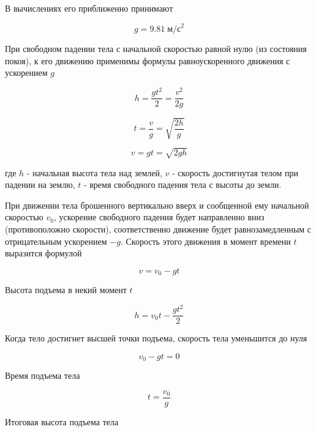 \documentclass[a4paper,12pt]{article}
\begin{document}
		В вычислениях его приближенно принимают

		\begin{equation*}
			g = 9.81 \; \text{м/с}^2
		\end{equation*}
		
		При свободном падении тела с начальной скоростью равной нулю 
		(из состояния покоя), к его движению применимы формулы
		равноускоренного движения с ускорением $g$

		\begin{equation}
			h = \frac{gt^2}{2} = \frac{v^2}{2g}
		\end{equation}

		\begin{equation}
			t = \frac{v}{g} = \sqrt{\frac{2h}{g}}
		\end{equation}

		\begin{equation}
			v = gt = \sqrt{2gh}
		\end{equation}

		где $h$ - начальная высота тела над землей, 
		$v$ - скорость достигнутая телом при падении на землю,
		$t$ - время свободного падения тела с высоты до земли.

		При движении тела брошенного вертикально вверх и сообщенной ему начальной 
		скоростью $v_0$, ускорение свободного падения будет направленно вниз 
		(противоположно скорости), соответственно движение будет равнозамедленным 
		с отрицательным ускорением $-g$. Скорость этого движения в момент времени $t$
		выразится формулой

		\begin{equation}
			v = v_0 - gt
		\end{equation}

		Высота подъема в некий момент $t$

		\begin{equation}
			h = v_0t - \frac{gt^2}{2}
		\end{equation}

		Когда тело достигнет высшей точки подъема, скорость тела уменьшится до нуля

		\begin{equation}
			v_0 - gt = 0
		\end{equation}

		Время подъема тела

		\begin{equation}
			t = \frac{v_0}{g}
		\end{equation}

		Итоговая высота подъема тела
\end{document}
